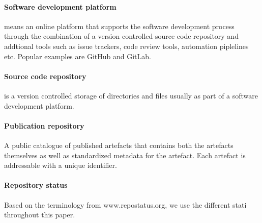 \documentclass{article}
\begin{document}
\paragraph{Software development platform}\label{sr1ngka3xwwa}
means an online platform that supports the software development process through the combination of a version controlled source code repository and addtional tools such as issue trackers, code review tools, automation piplelines etc. Popular examples are GitHub and GitLab.



\paragraph{Source code repository}\label{sb2fsk1enr1}
is a version controlled storage of directories and files usually as part of a software development platform.



\paragraph{Publication repository}\label{bu8qxagwu08b}
A public catalogue of published artefacts that contains both the artefacts themselves as well as standardized metadata for the artefact. Each artefact is addressable with a unique identifier. 



\paragraph{Repository status}\label{msegj6m7qry}
Based on the terminology from www.repostatus.org, we use the different stati throughout this paper.



\printbibliography
\end{document}
